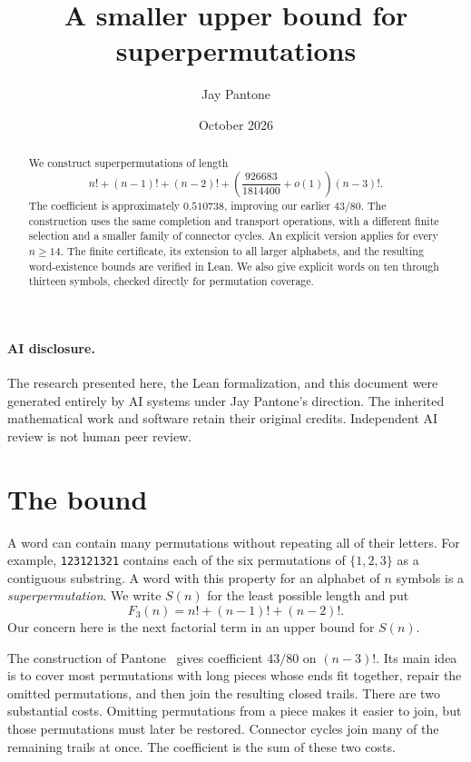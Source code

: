 \documentclass[11pt]{article}
\title{A smaller upper bound for superpermutations}
\author{Jay Pantone}
\date{October 2026}
\newcommand{\F}{F_3}
\newcommand{\word}[1]{\texttt{#1}}
\begin{document}
\maketitle

\begin{abstract}
We construct superpermutations of length
\[
 n!+(n-1)!+(n-2)!+
 \left(\frac{926683}{1814400}+o(1)\right)(n-3)!.
\]
The coefficient is approximately $0.510738$, improving our earlier
$43/80$. The construction uses the same completion and transport operations,
with a different finite selection and a smaller family of connector cycles.
An explicit version applies for every $n\ge14$. The finite certificate,
its extension to all larger alphabets, and the resulting word-existence
bounds are verified in Lean. We also give explicit words on ten through
thirteen symbols, checked directly for permutation coverage.
\end{abstract}

\paragraph{AI disclosure.}
The research presented here, the Lean formalization, and this document were generated entirely by AI systems under Jay Pantone's direction. The inherited mathematical work and software retain their original credits. Independent AI review is not human peer review.

\section{The bound}

A word can contain many permutations without repeating all of their
letters. For example, \word{123121321} contains each of the six permutations
of $\{1,2,3\}$ as a contiguous substring. A word with this property for an
alphabet of $n$ symbols is a \emph{superpermutation}. We write $S(n)$ for
the least possible length and put
\[
 \F(n)=n!+(n-1)!+(n-2)!.
\]
Our concern here is the next factorial term in an upper bound for $S(n)$.

The construction of Pantone~\cite{pantone} gives coefficient $43/80$ on
$(n-3)!$. Its main idea is to cover most permutations with long pieces
whose ends fit together, repair the omitted permutations, and then join
the resulting closed trails. There are two substantial costs. Omitting
permutations from a piece makes it easier to join, but those permutations
must later be restored. Connector cycles join many of the remaining
trails at once. The coefficient is the sum of these two costs.
\end{document}
